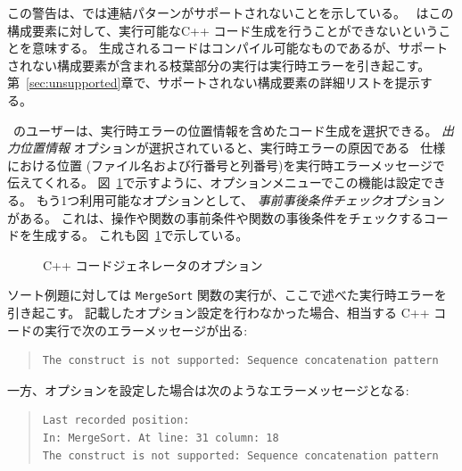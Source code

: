 \documentclass[\pformat,12pt]{jarticle}
\begin{document}
この警告は、\tcg{}では連結パターンがサポートされないことを示している。
\tcg\ はこの構成要素に対して、実行可能なC++ コード生成を行うことができないということを意味する。
生成されるコードはコンパイル可能なものであるが、サポートされない構成要素が含まれる枝葉部分の実行は実行時エラーを引き起こす。 
第~\ref{sec:unsupported}章で、サポートされない構成要素の詳細リストを提示する。

\tcg\ のユーザーは、実行時エラーの位置情報を含めたコード生成を選択できる。
{\em 出力位置情報} オプションが選択されていると、実行時エラーの原因である \VDM\ 仕様における位置 (ファイル名および行番号と列番号)を実行時エラーメッセージで伝えてくれる。
 図~\ref{fig:option}で示すように、オプションメニューでこの機能は設定できる。
もう1つ利用可能なオプションとして、 \textit{事前事後条件チェック}オプションがある。
これは、操作や関数の事前条件や関数の事後条件をチェックするコードを生成する。
これも図~\ref{fig:option}で示している。

\begin{figure}[tbh]
\begin{center}
\mbox{}
\caption{C++ コードジェネレータのオプション}\label{fig:option}
\end{center}
\end{figure}
  
ソート例題に対しては \texttt{MergeSort} 関数の実行が、ここで述べた実行時エラーを引き起こす。
記載したオプション設定を行わなかった場合、相当する C++ コードの実行で次のエラーメッセージが出る:
\begin{quote}
\begin{verbatim}
The construct is not supported: Sequence concatenation pattern
\end{verbatim}
\end{quote}
一方、オプションを設定した場合は次のようなエラーメッセージとなる:
\begin{quote}
\begin{verbatim}
Last recorded position:
In: MergeSort. At line: 31 column: 18
The construct is not supported: Sequence concatenation pattern
\end{verbatim}
\end{quote}
\end{document}
